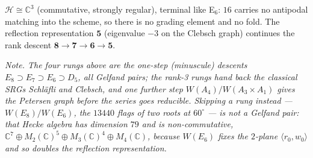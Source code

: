 \documentclass[10pt]{article}
\begin{document}
{\small $\mathcal H\cong\mathbb C^3$ (commutative, strongly regular), terminal
like E$_6$: $16$ carries no antipodal matching into the scheme, so there is no
grading element and no fold. The reflection representation $\mathbf 5$
(eigenvalue $-3$ on the Clebsch graph) continues the rank descent
$\mathbf 8\!\to\!\mathbf 7\!\to\!\mathbf 6\!\to\!\mathbf 5$.}

\vspace{14pt}
{\footnotesize\itshape Note. The four rungs above are the one-step (minuscule)
descents $E_8\supset E_7\supset E_6\supset D_5$, all Gelfand pairs; the rank-3
rungs hand back the classical SRGs Schl\"afli and Clebsch, and one further step
$W(A_4)/W(A_3{\times}A_1)$ gives the Petersen graph before the series goes
reducible. Skipping a rung instead --- $W(E_8)/W(E_6)$, the $13440$ flags of two
roots at $60^\circ$ --- is \emph{not} a Gelfand pair: that Hecke algebra has
dimension $79$ and is non-commutative,
$\mathbb C^7\oplus M_2(\mathbb C)^5\oplus M_3(\mathbb C)^4\oplus M_4(\mathbb C)$,
because $W(E_6)$ fixes the $2$-plane $\langle r_0,w_0\rangle$ and so doubles the
reflection representation.}
\end{document}
